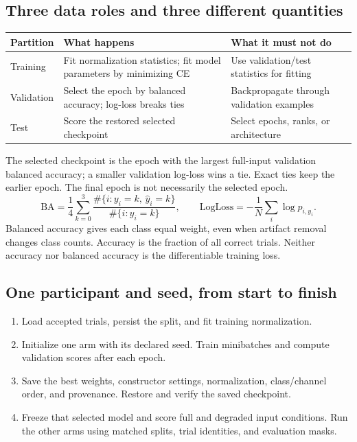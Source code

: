 \documentclass[11pt,a4paper]{article}
\begin{document}
\subsection*{Three data roles and three different quantities}
\begin{tabularx}{\linewidth}{@{}L{29mm}YY@{}}
\toprule
Partition & What happens & What it must not do \\
\midrule
Training & Fit normalization statistics; fit model parameters by minimizing CE & Use validation/test statistics for fitting \\
Validation & Select the epoch by balanced accuracy; log-loss breaks ties & Backpropagate through validation examples \\
Test & Score the restored selected checkpoint & Select epochs, ranks, or architecture \\
\bottomrule
\end{tabularx}

The selected checkpoint is the epoch with the largest full-input validation
balanced accuracy; a smaller validation log-loss wins a tie. Exact ties keep
the earlier epoch. The final epoch is not necessarily the selected epoch.
\[
\mathrm{BA}=\frac14\sum_{k=0}^{3}
 \frac{\#\{i:y_i=k,\,\widehat y_i=k\}}{\#\{i:y_i=k\}},\qquad
\mathrm{LogLoss}=-\frac1N\sum_i\log p_{i,y_i}.
\]
Balanced accuracy gives each class equal weight, even when artifact removal
changes class counts. Accuracy is the fraction of all correct trials. Neither
accuracy nor balanced accuracy is the differentiable training loss.

\subsection*{One participant and seed, from start to finish}
\begin{enumerate}
\item Load accepted trials, persist the split, and fit training normalization.
\item Initialize one arm with its declared seed. Train minibatches and compute
validation scores after each epoch.
\item Save the best weights, constructor settings, normalization, class/channel
order, and provenance. Restore and verify the saved checkpoint.
\item Freeze that selected model and score full and degraded input conditions.
Run the other arms using matched splits, trial identities, and evaluation masks.
\end{enumerate}
\end{document}
